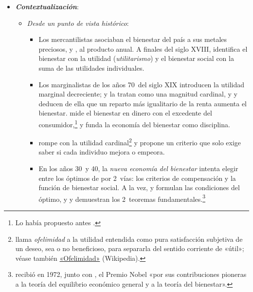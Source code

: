 \documentclass[11pt]{article}
\begin{document}
\begin{itemize}
\item \textbf{\emph{Contextualización}}:
  \begin{itemize}
  \item \emph{Desde un punto de vista histórico}:
    \begin{itemize}
    \item Los mercantilistas asociaban el bienestar del país a sus metales preciosos, y \textcite{Smith1776Wealth}, al producto anual. A finales del siglo XVIII, \textcite{Bentham1789Introduction} identifica el bienestar con la utilidad (\emph{utilitarismo}) y el bienestar social con la suma de las utilidades individuales.
    \item Los marginalistas de los años 70~del siglo XIX introducen la utilidad marginal decreciente\nocite{Jevons1871Theory,Menger1871Grundsatze,Walras1874Elements};  y  la tratan como una magnitud cardinal, y \textcite{Edgeworth1881Mathematical} y \textcite{Pigou1920Economics} deducen de ella que un reparto más igualitario de la renta aumenta el bienestar. \textcite{Marshall1890Principles} mide el bienestar en dinero con el excedente del consumidor,\footnote{Lo había propuesto antes \nocite{Dupuit1844Mesure} .} y \textcite{Pigou1920Economics} funda la economía del bienestar como disciplina.
    \item \textcite{Pareto1906Manuale} rompe con la utilidad cardinal\footnote{ llama \emph{ofelimidad} a la utilidad entendida como pura satisfacción subjetiva de un deseo, sea o no beneficioso, para separarla del sentido corriente de «útil»\nocite{Pareto1906Manuale,HETParetoSocial}; véase también \href{https://es.wikipedia.org/wiki/Ofelimidad}{«Ofelimidad»} (Wikipedia).} y propone un criterio que solo exige saber si cada individuo mejora o empeora.
    \item En los años 30~y 40, la \emph{nueva economía del bienestar} intenta elegir entre los óptimos de  por 2~vías: los criterios de compensación\nocite{Kaldor1939Welfare,Hicks1939Foundations} y la función de bienestar social\nocite{Bergson1938Reformulation,Samuelson1947Foundations}. A la vez, \textcite{Lerner1934Economic} y \textcite{Lange1942Foundations} formulan las condiciones del óptimo, y \textcite{Arrow1951Extension} y \textcite{Debreu1951Coefficient,Debreu1954Valuation} demuestran los 2~teoremas fundamentales.\footnote{ recibió en 1972, junto con , el Premio Nobel «por sus contribuciones pioneras a la teoría del equilibrio económico general y a la teoría del bienestar»\nocite{Nobel1972HicksArrow}.}

\end{itemize}
\end{itemize}
\end{itemize}
\end{document}
